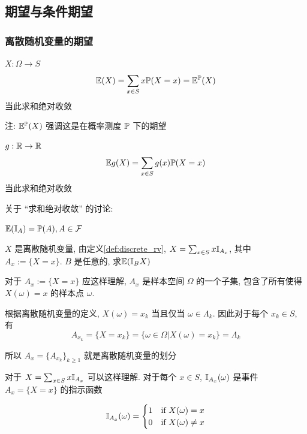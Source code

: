 \subsection{期望与条件期望}

\subsubsection{离散随机变量的期望}

\begin{definition}[$X$的期望]\label{def:E(x)}
    $X:\Omega\rightarrow S$
    \[
    \mathbb E(X)=\sum_{x\in S}x\mathbb{P}(X=x)=\mathbb E^{\mathbb{P}}(X)
    \]
    当此求和绝对收敛

    注: $\mathbb E^{\mathbb{P}}(X)$ 强调这是在概率测度 $\mathbb{P}$ 下的期望
\end{definition}

\begin{definition}[$g(X)$的期望]
    $g:\mathbb{R}\rightarrow \mathbb{R}$
    \[
    \mathbb E g(X)=\sum_{x\in S}g(x)\mathbb{P}(X=x)
    \]
    当此求和绝对收敛
\end{definition}

关于 “求和绝对收敛” 的讨论: 

\begin{example}\label{exa:expec2prob}
    $\mathbb E(\mathbb I_A)=\mathbb{P}(A), A\in \mathcal{F}$
\end{example}

\begin{example}\label{exa:expec_of_indica}
    $X$ 是离散随机变量, 由定义\ref{def:discrete_rv}, $X=\sum_{x\in S}x\mathbb I_{A_x}$, 其中 $A_x:=\{X=x\}$. $B$ 是任意的, 求$\mathbb E(\mathbb I_B X)$
\end{example}

\begin{remark}
对于 $A_x:=\{X=x\}$ 应这样理解, $A_x$ 是样本空间 $\Omega$ 的一个子集, 包含了所有使得 $X(\omega)=x$ 的样本点 $\omega$. 

根据离散随机变量的定义, $X(\omega)=x_k$ 当且仅当 $\omega\in \Lambda_k$. 因此对于每个 $x_k\in S$, 有
\[
A_{x_k}=\{X=x_k\}=\{\omega\in \Omega|X(\omega)=x_k\}=\Lambda_k
\]

所以 $A_x=\{A_{x_k}\}_{k\geq 1}$ 就是离散随机变量的划分

对于 $X=\sum_{x\in S}x\mathbb I_{A_x}$ 可以这样理解. 对于每个 $x\in S$, $\mathbb I_{A_x}(\omega)$ 是事件 $A_x=\{X=x\}$ 的指示函数

\[
    \mathbb I_{A_x}(\omega)=\begin{cases}
        1 & \text{if } X(\omega)=x\\
        0 & \text{if } X(\omega)\neq x
    \end{cases}
\]
\end{remark}

